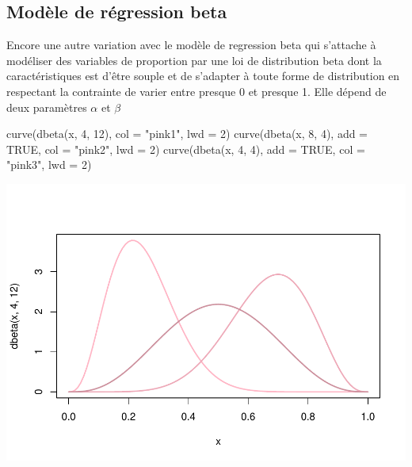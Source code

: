 \documentclass[
]{book}
\newenvironment{Shaded}{\begin{snugshade}}{\end{snugshade}}
\newcommand{\AttributeTok}[1]{\textcolor[rgb]{0.77,0.63,0.00}{#1}}
\newcommand{\ConstantTok}[1]{\textcolor[rgb]{0.00,0.00,0.00}{#1}}
\newcommand{\DecValTok}[1]{\textcolor[rgb]{0.00,0.00,0.81}{#1}}
\newcommand{\FunctionTok}[1]{\textcolor[rgb]{0.00,0.00,0.00}{#1}}
\newcommand{\NormalTok}[1]{#1}
\newcommand{\StringTok}[1]{\textcolor[rgb]{0.31,0.60,0.02}{#1}}
\begin{document}
\hypertarget{moduxe8le-de-ruxe9gression-beta}{%
\subsection{Modèle de régression beta}\label{moduxe8le-de-ruxe9gression-beta}}

Encore une autre variation avec le modèle de regression beta qui s'attache à modéliser des variables de proportion par une loi de distribution beta dont la caractéristiques est d'être souple et de s'adapter à toute forme de distribution en respectant la contrainte de varier entre presque 0 et presque 1. Elle dépend de deux paramètres \(\alpha\) et \(\beta\)

\begin{Shaded}
\begin{Highlighting}[]
\FunctionTok{curve}\NormalTok{(}\FunctionTok{dbeta}\NormalTok{(x, }\DecValTok{4}\NormalTok{, }\DecValTok{12}\NormalTok{),}
      \AttributeTok{col =} \StringTok{"pink1"}\NormalTok{, }
      \AttributeTok{lwd =} \DecValTok{2}\NormalTok{)}
\FunctionTok{curve}\NormalTok{(}\FunctionTok{dbeta}\NormalTok{(x, }\DecValTok{8}\NormalTok{, }\DecValTok{4}\NormalTok{),}
      \AttributeTok{add =} \ConstantTok{TRUE}\NormalTok{, }\AttributeTok{col =} \StringTok{"pink2"}\NormalTok{, }
      \AttributeTok{lwd =} \DecValTok{2}\NormalTok{)}
\FunctionTok{curve}\NormalTok{(}\FunctionTok{dbeta}\NormalTok{(x, }\DecValTok{4}\NormalTok{, }\DecValTok{4}\NormalTok{),}
      \AttributeTok{add =} \ConstantTok{TRUE}\NormalTok{, }\AttributeTok{col =} \StringTok{"pink3"}\NormalTok{, }
      \AttributeTok{lwd =} \DecValTok{2}\NormalTok{)}
\end{Highlighting}
\end{Shaded}

\includegraphics{bookdown-demo_files/figure-latex/0915-1.pdf}
\end{document}
